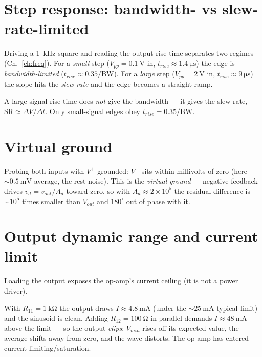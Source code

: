 \documentclass[11pt,a4paper,oneside]{book}
\newcommand{\Ad}{A_d}
\begin{document}
\section{Step response: bandwidth- vs slew-rate-limited}

Driving a \qty{1}{\kilo\hertz} square and reading the output rise time separates
two regimes (Ch.~\ref{ch:freq}). For a \emph{small} step ($V_{pp}=\qty{0.1}{\volt}$
in, $t_{rise}\approx\qty{1.4}{\micro\second}$) the edge is \emph{bandwidth-limited}
($t_{rise}\approx 0.35/\mathrm{BW}$). For a \emph{large} step
($V_{pp}=\qty{2}{\volt}$ in, $t_{rise}\approx\qty{9}{\micro\second}$) the slope hits
the \emph{slew rate} and the edge becomes a straight ramp.

\begin{warning}
A large-signal rise time does \emph{not} give the bandwidth --- it gives the slew
rate, $\mathrm{SR}\approx \Delta V/\Delta t$. Only small-signal edges obey
$t_{rise}=0.35/\mathrm{BW}$.
\end{warning}

\section{Virtual ground}

Probing both inputs with $V^{+}$ grounded: $V^{-}$ sits within millivolts of zero
(here $\sim\qty{0.5}{\milli\volt}$ average, the rest noise). This is the
\emph{virtual ground} --- negative feedback drives $v_d=v_{out}/\Ad$ toward zero,
so with $\Ad\approx 2\times10^{5}$ the residual difference is $\sim\!10^{5}$ times
smaller than $V_{out}$ and $180^{\circ}$ out of phase with it.

\section{Output dynamic range and current limit}

Loading the output exposes the op-amp's current ceiling (it is not a power driver).

\begin{wexample}
With $R_{11}=\qty{1}{\kilo\ohm}$ the output draws $I\approx\qty{4.8}{\milli\ampere}$
(under the $\sim\qty{25}{\milli\ampere}$ typical limit) and the sinusoid is clean.
Adding $R_{12}=\qty{100}{\ohm}$ in parallel demands $I\approx\qty{48}{\milli\ampere}$
--- above the limit --- so the output \emph{clips}: $V_{min}$ rises off its expected
value, the average shifts away from zero, and the wave distorts. The op-amp has
entered current limiting/saturation.
\end{wexample}
\end{document}
